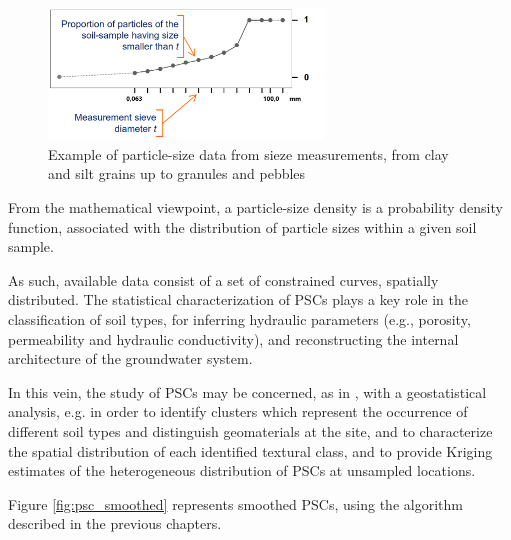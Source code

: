 \begin{figure}
	\includegraphics[height=3.5cm]{./pictures/psc/psc.png}
	\centering
	\caption{Example of particle-size data from sieze measurements, from clay and silt grains up to granules and pebbles}
	\label{fig:sieve}	
\end{figure}

From the mathematical viewpoint, a particle-size density is a probability density function, associated with the distribution of particle sizes within a given soil sample. 

As such, available data consist of a set of constrained curves, spatially distributed. The statistical characterization of PSCs plays a key role in the classification of soil types, for inferring hydraulic parameters (e.g., porosity, permeability and hydraulic conductivity), and reconstructing the internal architecture of the groundwater system. 

In this vein, the study of PSCs may be concerned, as in \citep{menafoglio:psc}, with a geostatistical analysis, e.g. in order to identify clusters which represent the occurrence of different soil types and distinguish geomaterials at the site, and to characterize the spatial distribution of each identified textural class, and to provide Kriging estimates of the heterogeneous distribution of PSCs at unsampled locations.

Figure \ref{fig:psc_smoothed} represents smoothed PSCs, using the algorithm described in the previous chapters.

